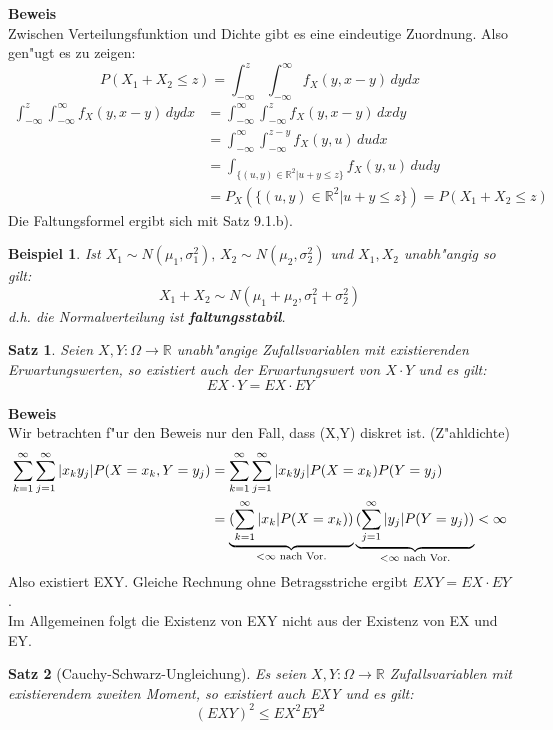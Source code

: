 \documentclass[a4paper,11pt]{book}
\newcommand{\R}{{\mathbb R}}
\newtheorem{Sa}{Satz}[chapter]
\newtheorem{Bsp}{Beispiel}[chapter]
\theoremstyle{nonumberplain}
\begin{document}
\textbf{Beweis}\\
Zwischen Verteilungsfunktion und Dichte gibt es eine eindeutige Zuordnung. Also gen"ugt es zu zeigen:
\[P(X_1+X_2\leq z)=\int_{-\infty}^z\int_{-\infty}^\infty f_X(y,x-y)\,dydx \]
\begin{align*}
\int_{-\infty}^z\int_{-\infty}^\infty f_X(y,x-y)\,dydx
&= \int_{-\infty}^\infty \int_{-\infty}^z f_X(y,x-y)\,dxdy \\
&=\int_{-\infty}^\infty \int_{-\infty}^{z-y} f_X(y,u)\,dudx \\
&= \int_{\{(u,y)\in\R^2|u+y\leq z\}} f_X(y,u)\,dudy\\
&= P_X(\{(u,y)\in\R^2|u+y\leq z\}) = P(X_1+X_2\leq z)
\end{align*}
Die Faltungsformel ergibt sich mit Satz 9.1.b).

\begin{Bsp}
Ist $X_1\sim N(\mu_1,\sigma_1^2),\,X_2\sim N(\mu_2,\sigma_2^2)$ und $X_1,X_2$ unabh"angig so gilt:
\[X_1+X_2\sim N(\mu_1+\mu_2, \sigma_1^2+\sigma_2^2)\]
d.h. die Normalverteilung ist \textbf{faltungsstabil}.
\end{Bsp}

\begin{Sa}
Seien $X,Y:\Omega\rightarrow \R$ unabh"angige Zufallsvariablen mit existierenden Erwartungswerten, so existiert auch der Erwartungswert von $X\cdot Y$ und es gilt:
\[ EX\cdot Y = EX\cdot EY \]
\end{Sa}

\textbf{Beweis}\\
Wir betrachten f"ur den Beweis nur den Fall, dass (X,Y) diskret ist. (Z"ahldichte)
\begin{align*}
\sum_{k=1}^\infty\sum_{j=1}^\infty |x_ky_j| P(X=x_k, Y=y_j)
&=\sum_{k=1}^\infty\sum_{j=1}^\infty |x_ky_j|P(X=x_k)P(Y=y_j) \\
&=\underbrace{(\sum_{k=1}^\infty |x_k| P(X=x_k))}_{<\infty\textnormal{ nach Vor.}}\underbrace{(\sum_{j=1}^\infty |y_j| P(Y=y_j))}_{<\infty\textnormal{ nach Vor.}}< \infty
\end{align*}
Also existiert EXY. Gleiche Rechnung ohne Betragsstriche ergibt $EXY=EX\cdot EY$.\\
Im Allgemeinen folgt die Existenz von EXY nicht aus der Existenz von EX und EY.

\begin{Sa}[Cauchy-Schwarz-Ungleichung]
Es seien $X,Y:\Omega\to\R$ Zufallsvariablen mit existierendem zweiten Moment, so existiert auch EXY und es gilt:
\[(EXY)^2\leq EX^2EY^2\]
\end{Sa}
\end{document}
